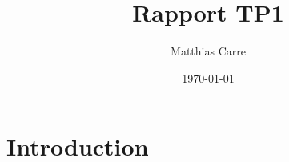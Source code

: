 \documentclass{article}
\title{Rapport TP1}
\author{Matthias Carre}
\date{\today}
\begin{document}
\maketitle

\section{Introduction}
\end{document}

